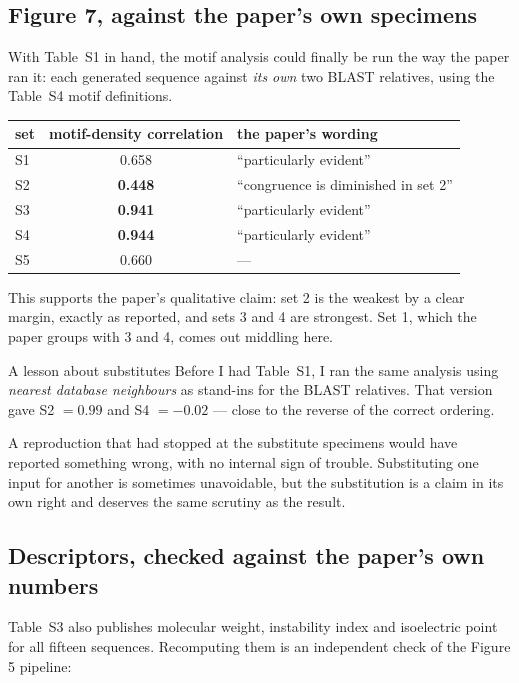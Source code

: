 \subsection{Figure 7, against the paper's own specimens}

With Table~S1 in hand, the motif analysis could finally be run the way the
paper ran it: each generated sequence against \emph{its own} two BLAST
relatives, using the Table~S4 motif definitions.

\begin{center}
\small
\begin{tabular}{lcl}
\toprule
\textbf{set} & \textbf{motif-density correlation} & \textbf{the paper's wording} \\
\midrule
S1 & 0.658 & ``particularly evident'' \\
S2 & \textbf{0.448} & ``congruence is diminished in set 2'' \\
S3 & \textbf{0.941} & ``particularly evident'' \\
S4 & \textbf{0.944} & ``particularly evident'' \\
S5 & 0.660 & --- \\
\bottomrule
\end{tabular}
\end{center}

This supports the paper's qualitative claim: set 2 is the weakest by a clear
margin, exactly as reported, and sets 3 and 4 are strongest. Set 1, which the
paper groups with 3 and 4, comes out middling here.

\begin{warnbox}{A lesson about substitutes}
Before I had Table~S1, I ran the same analysis using \emph{nearest database
neighbours} as stand-ins for the BLAST relatives. That version gave S2 $= 0.99$
and S4 $= -0.02$ --- close to the reverse of the correct ordering.

A reproduction that had stopped at the substitute specimens would have reported
something wrong, with no internal sign of trouble. Substituting one input for
another is sometimes unavoidable, but the substitution is a claim in its own
right and deserves the same scrutiny as the result.
\end{warnbox}

\subsection{Descriptors, checked against the paper's own numbers}

Table~S3 also publishes molecular weight, instability index and isoelectric
point for all fifteen sequences. Recomputing them is an independent check of
the Figure 5 pipeline:

